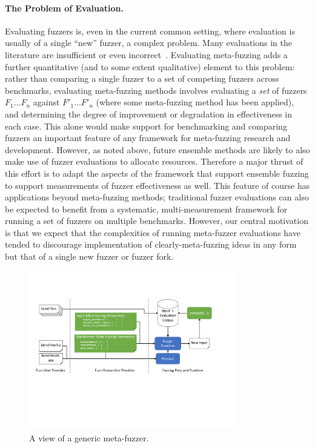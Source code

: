 \paragraph{The Problem of Evaluation.} Evaluating fuzzers is, even in the 
current common setting, where evaluation is usually of a single ``new'' fuzzer, 
a complex problem. Many evaluations in the literature are insufficient or even 
incorrect~\cite{FuzzerHicks}.  Evaluating meta-fuzzing adds a further quantitative (and to some 
extent qualitative) element to this problem: rather than comparing a single 
fuzzer to a set of competing fuzzers across benchmarks, evaluating meta-fuzzing 
methods involves evaluating a \emph{set} of fuzzers $F_1 \ldots F_n$ against 
$F'_1 \ldots F'_n$ (where some meta-fuzzing method has been applied), and 
determining the degree of improvement or degradation in effectiveness in each 
case.  This alone would make support for benchmarking and comparing fuzzers an 
important feature of any framework for meta-fuzzing research and development.  
However, as noted above, future ensemble methods are likely to also make use of 
fuzzer evaluations to allocate resources.  Therefore a major thrust of this 
effort is to adapt the aspects of the framework that support ensemble fuzzing 
to support measurements of fuzzer effectiveness as well.  This feature of 
course has applications beyond meta-fuzzing methods; traditional fuzzer 
evaluations can also be expected to benefit from a systematic, 
multi-measurement framework for running a set of fuzzers on multiple
benchmarks.  However, our central motivation is that we expect that the complexities of running
meta-fuzzer evaluations have tended to discourage implementation of
clearly-meta-fuzzing ideas in any form but that of a single new fuzzer
or fuzzer fork.


\begin{figure}
\centering
\includegraphics[width=0.8\textwidth,trim={0.3in 3.0in 1.2in 1.4in},clip]{figures/fuzzer-arch.pdf}
\caption{A view of a generic meta-fuzzer.}
\label{fig:meta}
\end{figure}

